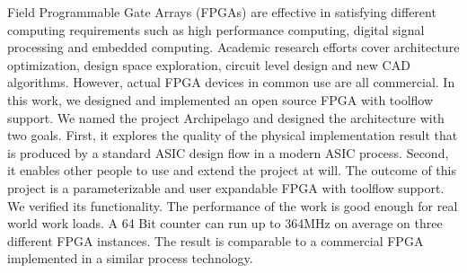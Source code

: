 Field Programmable Gate Arrays (FPGAs) are effective in satisfying different computing requirements such as high performance computing,
digital signal processing and embedded computing. Academic research efforts cover architecture optimization, design space exploration,
circuit level design and new CAD algorithms. However, actual FPGA devices in common use are all commercial. In this work, we designed
and implemented an open source FPGA with toolflow support. We named the project Archipelago and designed the architecture with two
goals. First, it explores the quality of the physical implementation result that is produced by a standard ASIC design flow in a modern
ASIC process. Second, it enables other people to use and extend the project at will. The outcome of this project is a parameterizable and
user expandable FPGA with toolflow support. We verified its functionality. The performance of the work is good enough for real
world work loads. A 64 Bit counter can run up to 364MHz on average on three different FPGA instances. 
The result is comparable to a commercial FPGA implemented in a similar process technology. \par